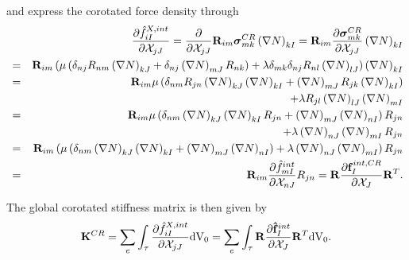 and express the corotated force density through
\begin{eqnarray}
& &\frac{\partial \hat{f} ^{X,int}_{iI} }{\partial \mathcal{X}  _{jJ}} = \frac{\partial}{\partial \mathcal{X}  _{jJ}}  \mathbf{R}_{im} \boldsymbol{\sigma}^{CR}_{mk}   \left(  \nabla N \right)_{kI} = \mathbf{R}_{im} \frac{\partial \boldsymbol{\sigma}^{CR}_{mk}}{\partial \mathcal{X}  _{jJ}}    \left(  \nabla N \right)_{kI} \notag \\
&=&   \mathbf{R}_{im} \left( \mu \left(  \delta_{nj} R_{nm}  \left( \nabla N \right)_{kJ}  + \delta_{nj}\left( \nabla N \right)_{mJ} R_{nk}  \right) + \lambda  \delta _{mk}  \delta_{nj} R_{nl}  \left( \nabla N \right)_{lJ}  \right)   \left(  \nabla N \right)_{kI}  \notag \\
&=& \mathbf{R}_{im}   \mu \left(  \delta_{nm} R_{jn}  \left( \nabla N \right)_{kJ} \left(  \nabla N \right)_{kI} + \left( \nabla N \right)_{mJ} R_{jk} \left(  \nabla N \right)_{kI} \right) \notag \\
& &+ \lambda    R_{jl}  \left( \nabla N \right)_{lJ} \left(  \nabla N \right)_{mI}   \notag \\
&=& \mathbf{R}_{im}   \mu \left(  \delta_{nm}   \left( \nabla N \right)_{kJ} \left(  \nabla N \right)_{kI} R_{jn} + \left( \nabla N \right)_{mJ}  \left(  \nabla N \right)_{nI} \right) R_{jn} \notag \\
& &+ \lambda     \left( \nabla N \right)_{nJ} \left(  \nabla N \right)_{mI}  R_{jn}  \notag \\
&=& \mathbf{R}_{im}   \left( \mu \left(  \delta_{nm}   \left( \nabla N \right)_{kJ} \left(  \nabla N \right)_{kI}  + \left( \nabla N \right)_{mJ}  \left(  \nabla N \right)_{nI} \right) + \lambda     \left( \nabla N \right)_{nJ} \left(  \nabla N \right)_{mI} \right) R_{jn}  \notag \\
&=& \mathbf{R}_{im}  \frac{\partial \hat{f}  ^{int}_{mI} }{\partial \mathcal{X}  _{nJ}}   R_{jn} = \mathbf{R}  \frac{\partial \mathbf f ^{int,CR}_I }{\partial \mathcal{X}  _{J}}   \mathbf{R}^T .
\end{eqnarray}

The global corotated stiffness matrix is then given by
\begin{eqnarray}
\mathbf K ^{CR} =  \sum_{e} \int _{\tau}  \frac{\partial \hat{f} ^{X,int}_{iI} }{\partial \mathcal{X}  _{jJ}}  \textnormal{dV}_0 = \sum_{e} \int _{\tau}   \mathbf{R}  \frac{\partial \mathbf {\hat{f}} ^{int}_I }{\partial \mathcal{X}  _{J}}   \mathbf{R}^T  \textnormal{dV}_0. 
\end{eqnarray}

